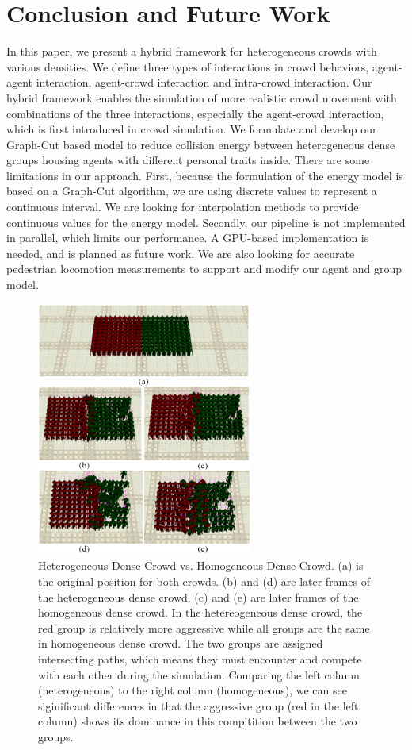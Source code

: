 \documentclass[conference]{acmsiggraph}
\begin{document}
\section{Conclusion and Future Work}
\label{section:7}
In this paper, we present a hybrid framework for heterogeneous crowds with various densities. We define three types of interactions in crowd behaviors, agent-agent interaction, agent-crowd interaction and intra-crowd interaction. Our hybrid framework enables the simulation of more realistic crowd movement with combinations of the three interactions, especially the agent-crowd interaction, which is first introduced in crowd simulation. We formulate and develop our Graph-Cut based model to reduce collision energy between heterogeneous dense groups housing agents with different personal traits inside. 
There are some limitations in our approach. First, because the formulation of the energy model is based on a Graph-Cut algorithm, we are using discrete values to represent a continuous interval. We are looking for interpolation methods to provide continuous values for the energy model. Secondly, our pipeline is not implemented in parallel, which limits our performance. A GPU-based implementation is needed, and is planned as future work. We are also looking for accurate pedestrian locomotion measurements to support and modify our agent and group model.

\begin{figure}
  \centering
  \includegraphics[width=2.8in]{images/heterogeneous_crowd}
  \caption{Heterogeneous Dense Crowd vs. Homogeneous Dense Crowd. (a) is the original position for both crowds. (b) and (d) are later frames of the heterogeneous dense crowd. (c) and (e) are later frames of the homogeneous dense crowd. In the hetereogeneous dense crowd, the red group is relatively more aggressive while all groups are the same in homogeneous dense crowd. The two groups are assigned intersecting paths, which means they must encounter and compete with each other during the simulation. Comparing the left column (heterogeneous) to the right column (homogeneous), we can see siginificant differences in that the aggressive group (red in the left column) shows its dominance in this compitition between the two groups.}
  \label{figure:heterogeneouscrowd}
\end{figure}



\end{document}

